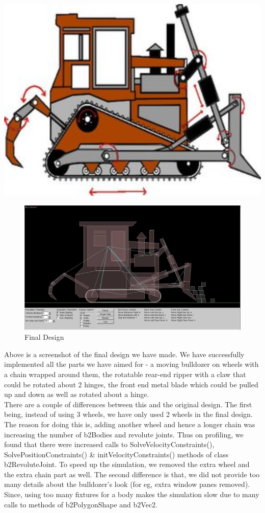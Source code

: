 \documentclass[11pt]{article}
\begin{document}
\begin{center} 
\includegraphics [scale=0.3]{./images/original} 
\end{center} 

\begin{figure}
\centering 
\includegraphics [scale=0.3]{./images/final} 
\caption{Final Design}
\end{figure}
Above is a screenshot of the final design we have made. We have successfully implemented all the parts we have aimed for - a moving bulldozer on wheels with a chain wrapped around them, the rotatable rear-end ripper with a claw that could be rotated about 2 hinges, the front end metal blade which could be pulled up and down as well as rotated about a hinge. \\
There are a couple of differences between this and the original design. The first being, instead of using 3 wheels, we have only used 2 wheels in the final design. The reason for doing this is, adding another wheel and hence a longer chain was increasing the number of b2Bodies and revolute joints. Thus on profiling, we found that there were increased calls to SolveVelocityConstraints(), SolvePositionConstraints() \& initVelocityConstraints() methods of class b2RevoluteJoint. To speed up the simulation, we removed the extra wheel and the extra chain part as well. The second difference is that, we did not provide too many details about the bulldozer's look (for eg, extra window panes removed). Since, using too many fixtures for a body makes the simulation slow due to many calls to methods of b2PolygonShape and b2Vec2. 
\end{document}
